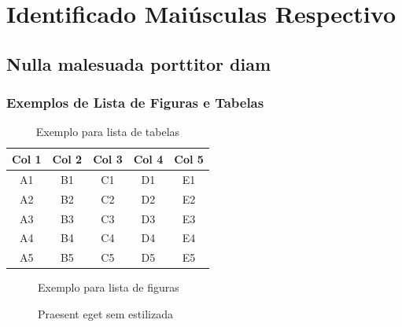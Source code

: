 \documentclass[a4paper,12pt,brazilian,oneside]{Relatorio}
\begin{document}
\anexos
\chapter{Identificado Maiúsculas Respectivo}
\section{Nulla malesuada porttitor diam}
\lipsum[3]

\subsection{Exemplos de Lista de Figuras e Tabelas}
\lipsum[15]

\begin{table}[ht]
    \centering
    \label{tab:estilosa}
    \begin{tabular}{ccccc}
        \toprule
        Col 1 & Col 2 & Col 3 & Col 4 & Col 5 \\
        \midrule
        A1 & B1 & C1 & D1 & E1 \\
        A2 & B2 & C2 & D2 & E2 \\
        A3 & B3 & C3 & D3 & E3 \\
        A4 & B4 & C4 & D4 & E4 \\
        A5 & B5 & C5 & D5 & E5 \\
        \bottomrule
    \end{tabular}
    \caption{Exemplo para lista de tabelas}
\end{table}

\begin{figure}[ht]
    \centering
    \caption{Exemplo para lista de figuras}
    \label{fig:teste-estilosa}
\end{figure}
\begin{figure}[ht]
    \centering
    \caption{Praesent eget sem estilizada}
    \label{fig:teste-estilosa}
\end{figure}
\end{document}
